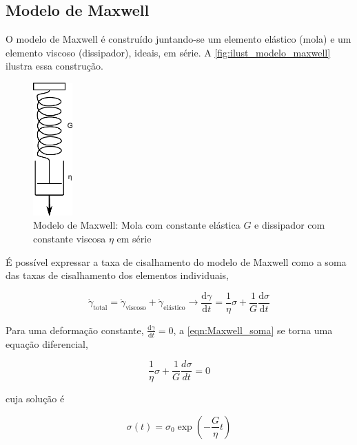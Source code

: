			\FloatBarrier
			
			\subsection{Modelo de Maxwell} 
			\label{sec:modelo_maxwell}
			O modelo de Maxwell é construído juntando-se um elemento elástico (mola) e um elemento viscoso (dissipador), ideais, em série. A \autoref{fig:ilust_modelo_maxwell} ilustra essa construção.
			
			\begin{figure}[h]
				\centering
				\includegraphics[width=1.5cm]{./imagens/reologia/maxwell_mola_dissipador}
				\caption{Modelo de Maxwell: Mola com constante elástica \(G\) e dissipador com constante viscosa \(\eta\) em série}
				\label{fig:ilust_modelo_maxwell}
			\end{figure}

			 É possível expressar a taxa de cisalhamento do modelo de Maxwell como a soma das taxas de cisalhamento dos elementos individuais,
			 
			\begin{equation}
				\dot{\gamma}_{\textrm{total}} =  \dot{\gamma}_{\textrm{viscoso}} + \dot{\gamma}_{\textrm{elástico}} \to
				\dfrac{\mathrm{d}\gamma}{\mathrm{d}t} = \dfrac{1}{\eta}\sigma + \dfrac{1}{G}\dfrac{\mathrm{d}\sigma}{\mathrm{d}t}
				\label{eqn:Maxwell_soma}
			\end{equation}
			
			Para uma deformação constante, \(\frac{\mathrm{d}\gamma}{\mathrm{d}t}=0\), a \autoref{eqn:Maxwell_soma} se torna uma equação diferencial,
			
			\begin{equation}
				\dfrac{1}{\eta}\sigma + \dfrac{1}{G}\dfrac{d\sigma}{dt} = 0
				\label{eqn:Maxwell_diferencial}
			\end{equation}
			
			\noindent cuja solução é 
			
			\begin{equation}
				\sigma(t) = \sigma_0 \exp \left( -\dfrac{G}{\eta}t \right)
				\label{eqn:Maxwell_dif_resolvida}
			\end{equation}
			
